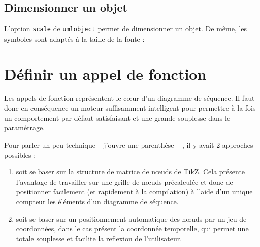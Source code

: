 \documentclass[a4paper,11pt]{report}
\newcommand{\inputTikZ}[1]{%
  }%
\newcommand{\inputTikZ}[1]{%
    \texttt{[image: fig/\#1.pdf]}%
  }%
\newcommand{\TikZ}{{\sc TikZ}}
\begin{document}
\subsection{Dimensionner un objet}\label{ss.objdim}

L'option {\tt scale} de {\tt umlobject} permet de dimensionner un objet. De même, les symboles sont adaptés à la taille de la fonte :

\medskip

\begin{minipage}{0.5\textwidth}

\end{minipage}
\begin{minipage}{0.5\textwidth}
\begin{center}
\inputTikZ{objectscale}
\end{center}
\end{minipage}

\begin{minipage}{0.5\textwidth}

\end{minipage}
\begin{minipage}{0.5\textwidth}
\begin{center}
\inputTikZ{objectfont}
\end{center}
\end{minipage}

\section{Définir un appel de fonction}\label{s.calls}

Les appels de fonction représentent le c\oe{}ur d'un diagramme de séquence. Il faut donc en conséquence un moteur suffisamment intelligent pour permettre à la fois un comportement par défaut satisfaisant et une grande souplesse dans le paramétrage. 

Pour parler un peu technique -- j'ouvre une parenthèse -- , il y avait 2 approches possibles :

\begin{enumerate}
\item soit se baser sur la structure de matrice de n\oe{}uds de \TikZ. Cela présente l'avantage de travailler sur une grille de n\oe{}uds précalculée et donc de positionner facilement (et rapidement à la compilation) à l'aide d'un unique compteur les éléments d'un diagramme de séquence. 
\item soit se baser sur un positionnement automatique des n\oe{}uds par un jeu de coordonnées, dans le cas présent la coordonnée temporelle, qui permet une totale souplesse et facilite la reflexion de l'utilisateur.
\end{enumerate}
\end{document}
